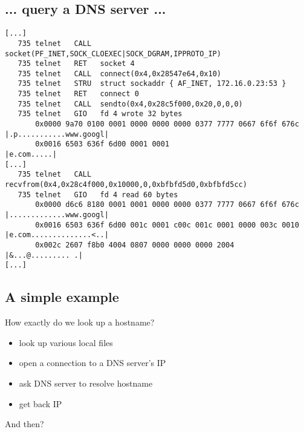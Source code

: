 \documentclass[xga]{xdvislides}
\newcommand{\smallish}{\fontsize{16}{16}\selectfont}
\begin{document}
\subsection{... query a DNS server ...}
\smallish
\begin{verbatim}
[...]
   735 telnet   CALL  socket(PF_INET,SOCK_CLOEXEC|SOCK_DGRAM,IPPROTO_IP)
   735 telnet   RET   socket 4
   735 telnet   CALL  connect(0x4,0x28547e64,0x10)
   735 telnet   STRU  struct sockaddr { AF_INET, 172.16.0.23:53 }
   735 telnet   RET   connect 0
   735 telnet   CALL  sendto(0x4,0x28c5f000,0x20,0,0,0)
   735 telnet   GIO   fd 4 wrote 32 bytes
       0x0000 9a70 0100 0001 0000 0000 0000 0377 7777 0667 6f6f 676c  |.p...........www.googl|
       0x0016 6503 636f 6d00 0001 0001                                |e.com.....|
[...]
   735 telnet   CALL  recvfrom(0x4,0x28c4f000,0x10000,0,0xbfbfd5d0,0xbfbfd5cc)
   735 telnet   GIO   fd 4 read 60 bytes
       0x0000 d6c6 8180 0001 0001 0000 0000 0377 7777 0667 6f6f 676c  |.............www.googl|
       0x0016 6503 636f 6d00 001c 0001 c00c 001c 0001 0000 003c 0010  |e.com..............<..|
       0x002c 2607 f8b0 4004 0807 0000 0000 0000 2004                 |&...@......... .|
[...]
\end{verbatim}
\Normalsize

\subsection{A simple example}
How exactly do we look up a hostname?
\\
\begin{itemize}
	\item look up various local files
	\item open a connection to a DNS server's IP
	\item ask DNS server to resolve hostname
	\item get back IP
\end{itemize}
\vspace{.5in}

And then?
\end{document}
